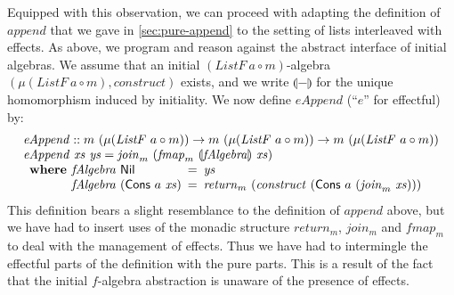 \documentclass{jfp1}
\newcommand{\fold}[1]{\llparenthesis #1 \rrparenthesis}
\begin{document}
Equipped with this observation, we can proceed with adapting the
definition of $\mathit{append}$ that we gave in
\autoref{sec:pure-append} to the setting of lists interleaved with
effects. As above, we program and reason against the abstract
interface of initial algebras. We assume that an initial
$(\mathit{ListF}~a \circ m)$-algebra $(\mu(\mathit{ListF}~a \circ m),
\mathit{construct})$ exists, and we write $\fold{-}$ for the unique
homomorphism induced by initiality. We now define $\mathit{eAppend}$
(``$\mathit{e}$'' for effectful) by:
\begin{displaymath}
  \begin{array}{l}
    \mathit{eAppend} :: m~(\mu (\mathit{ListF}~a \circ m)) \to m~(\mu (\mathit{ListF}~a \circ m)) \to m~(\mu (\mathit{ListF}~a \circ m)) \\
    \mathit{eAppend}~\mathit{xs}~\mathit{ys} = \mathit{join}_m~(\mathit{fmap}_m~\fold{\mathit{fAlgebra}}~\mathit{xs}) \\
    \begin{array}{r@{\hspace{0.4em}}l@{\hspace{0.5em}}c@{\hspace{0.5em}}l}
      \textbf{where} & \mathit{fAlgebra}~\mathsf{Nil} &=& \mathit{ys} \\
                     & \mathit{fAlgebra}~(\mathsf{Cons}~a~\mathit{xs}) &=& \mathit{return}_m~(\mathit{construct}~(\mathsf{Cons}~a~(\mathit{join}_m~\mathit{xs})))
    \end{array}
  \end{array}
\end{displaymath}
This definition bears a slight resemblance to the definition of
$\mathit{append}$ above, but we have had to insert uses of the monadic
structure $\mathit{return_m}$, $\mathit{join_m}$ and $\mathit{fmap_m}$
to deal with the management of effects. Thus we have had to
intermingle the effectful parts of the definition with the pure
parts. This is a result of the fact that the initial $f$-algebra
abstraction is unaware of the presence of effects.
\end{document}
